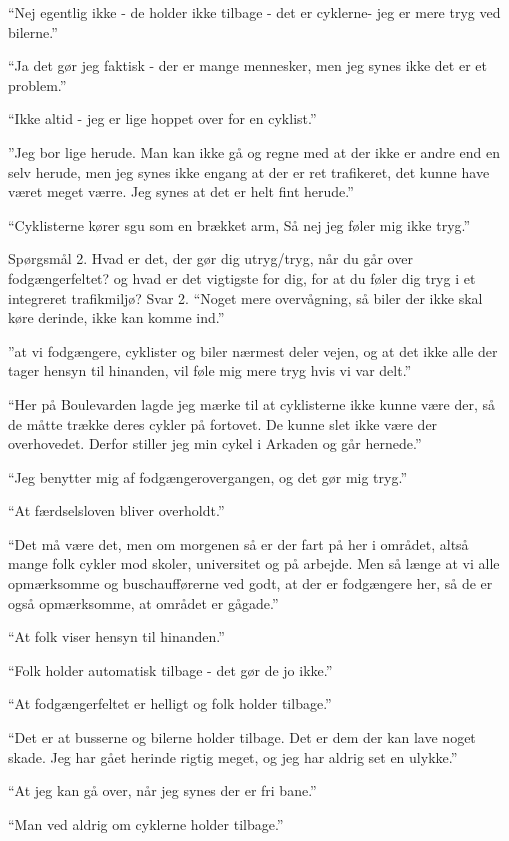 \begin{appendics}
“Nej egentlig ikke - de holder ikke tilbage - det er cyklerne- jeg er mere tryg ved bilerne.”

“Ja det gør jeg faktisk - der er mange mennesker, men jeg synes ikke det er et problem.”

“Ikke altid - jeg er lige hoppet over for en cyklist.”

”Jeg bor lige herude. Man kan ikke gå og regne med at der ikke er andre end en selv herude, men jeg synes ikke engang at der er ret trafikeret, det kunne have været meget værre. Jeg synes at det er helt fint herude.”

“Cyklisterne kører sgu som en brækket arm, Så nej jeg føler mig ikke tryg.”

Spørgsmål 2. 
Hvad er det, der gør dig utryg/tryg, når du går over fodgængerfeltet? og hvad er det vigtigste for dig, for at du føler dig tryg i et integreret trafikmiljø?
 Svar 2.
“Noget mere overvågning, så biler der ikke skal køre derinde, ikke kan komme ind.”

”at vi fodgængere, cyklister og biler nærmest deler vejen, og at det ikke alle der tager hensyn til hinanden, vil føle mig mere tryg hvis vi var delt.”

“Her på Boulevarden lagde jeg mærke til at cyklisterne ikke kunne være der, så de måtte trække deres cykler på fortovet. De kunne slet ikke være der overhovedet.  Derfor stiller jeg min cykel i Arkaden og går hernede.”

“Jeg benytter mig af fodgængerovergangen, og det gør mig tryg.”

“At færdselsloven bliver overholdt.”

“Det må være det, men om morgenen så er der fart på her i området, altså mange folk cykler mod skoler, universitet og på arbejde. Men så længe at vi alle opmærksomme og buschaufførerne ved godt, at der er fodgængere her, så de er også opmærksomme, at området er gågade.”

“At folk viser hensyn til hinanden.”

“Folk holder automatisk tilbage - det gør de jo ikke.”

“At fodgængerfeltet er helligt og folk holder tilbage.”

“Det er at busserne og bilerne holder tilbage. Det er dem der kan lave noget skade. Jeg har gået herinde rigtig meget, og jeg har aldrig set en ulykke.”

“At jeg kan gå over, når jeg synes der er fri bane.” 

“Man ved aldrig om cyklerne holder tilbage.” 


\end{appendics}
